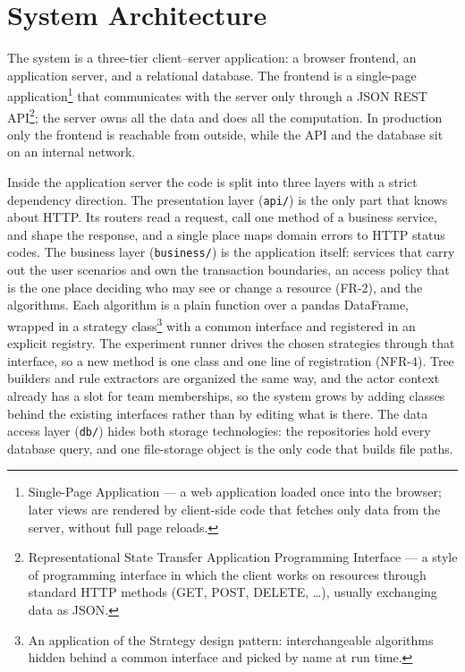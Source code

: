\section{System Architecture}

The system is a three-tier client--server application: a browser frontend, an application server, and a relational database. The frontend is a single-page application\footnote{Single-Page Application --- a web application loaded once into the browser; later views are rendered by client-side code that fetches only data from the server, without full page reloads.} that communicates with the server only through a JSON REST API\footnote{Representational State Transfer Application Programming Interface --- a style of programming interface in which the client works on resources through standard HTTP methods (GET, POST, DELETE, \ldots), usually exchanging data as JSON.}; the server owns all the data and does all the computation. In production only the frontend is reachable from outside, while the API and the database sit on an internal network.

Inside the application server the code is split into three layers with a strict dependency direction. The presentation layer (\texttt{api/}) is the only part that knows about HTTP. Its routers read a request, call one method of a business service, and shape the response, and a single place maps domain errors to HTTP status codes. The business layer (\texttt{business/}) is the application itself: services that carry out the user scenarios and own the transaction boundaries, an access policy that is the one place deciding who may see or change a resource (FR-2), and the algorithms. Each algorithm is a plain function over a pandas DataFrame, wrapped in a strategy class\footnote{An application of the Strategy design pattern: interchangeable algorithms hidden behind a common interface and picked by name at run time.} with a common interface and registered in an explicit registry. The experiment runner drives the chosen strategies through that interface, so a new method is one class and one line of registration (NFR-4). Tree builders and rule extractors are organized the same way, and the actor context already has a slot for team memberships, so the system grows by adding classes behind the existing interfaces rather than by editing what is there. The data access layer (\texttt{db/}) hides both storage technologies: the repositories hold every database query, and one file-storage object is the only code that builds file paths.

